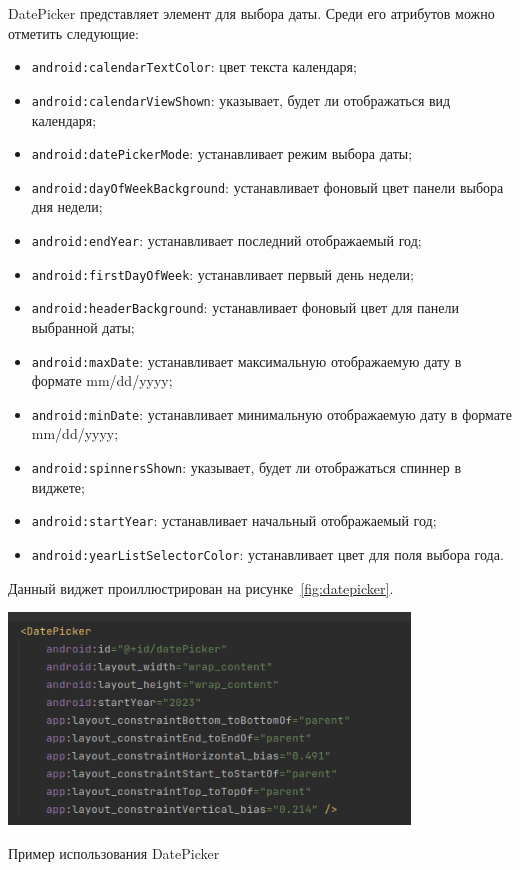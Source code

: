 DatePicker представляет элемент для выбора даты. Среди его атрибутов 
можно отметить следующие:
\begin{itemize}
	\item \texttt{android:calendarTextColor}: цвет текста календаря;
	\item \texttt{android:calendarViewShown}: указывает, будет ли
		отображаться вид календаря;
	\item \texttt{android:datePickerMode}: устанавливает режим выбора даты;
	\item \texttt{android:dayOfWeekBackground}: устанавливает фоновый цвет
		панели выбора дня недели;
	\item \texttt{android:endYear}: устанавливает последний отображаемый год;
	\item \texttt{android:firstDayOfWeek}: устанавливает первый день недели;
	\item \texttt{android:headerBackground}: устанавливает фоновый цвет
		для панели выбранной даты;
	\item \texttt{android:maxDate}: устанавливает максимальную отображаемую
		дату в формате mm/dd/yyyy;
	\item \texttt{android:minDate}: устанавливает минимальную отображаемую
		дату в формате mm/dd/yyyy;
	\item \texttt{android:spinnersShown}: указывает, будет ли отображаться
		спиннер в виджете;
	\item \texttt{android:startYear}: устанавливает начальный
		отображаемый год;
	\item \texttt{android:yearListSelectorColor}: устанавливает цвет для
		поля выбора года.
\end{itemize}

Данный виджет проиллюстрирован на рисунке~\ref{fig:datepicker}.

\begin{image}
	\includegraphics[width=0.8\textwidth]{Screenshot from 2023-03-25 18-07-26.png}
	\caption{Пример использования DatePicker}
	\label{fig:datepicker}
\end{image}

